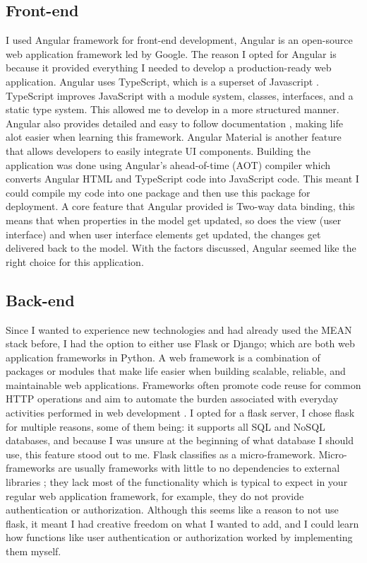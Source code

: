 \subsection{Front-end}
I used Angular framework for front-end development, Angular is an open-source web application framework led by Google. The reason I opted for Angular is because it provided everything I needed to develop a production-ready web application. Angular uses TypeScript, which is a superset of Javascript \cite{bierman2014understanding}. TypeScript improves JavaScript with a module system, classes, interfaces, and a static type system. This allowed me to develop in a more structured manner. Angular also provides detailed and easy to follow documentation \cite{docsangular}, making life alot easier when learning this framework.
Angular Material is another feature that allows developers to easily integrate UI components. Building the application was done using Angular's ahead-of-time (AOT) compiler \cite{aotc} which converts Angular HTML and TypeScript code into JavaScript code. This meant I could compile my code into one package and then use this package for deployment. A core feature that Angular provided is Two-way data binding, this means that when properties in the model get updated, so does the view (user interface) and when user interface elements get updated, the changes get delivered back to the model.
With the factors discussed, Angular seemed like the right choice for this application.
\subsection{Back-end}
Since I wanted to experience new technologies and had already used the MEAN stack before, I had the option to either use Flask or Django; which are both web application frameworks in Python. A web framework is a combination of packages or modules that make life easier when building scalable, reliable, and maintainable web applications. Frameworks often promote code reuse for common HTTP operations and aim to automate the burden associated with everyday activities performed in web development \cite{rengglib2004seaside}. \hfill \break
I opted for a flask server, I chose flask for multiple reasons, some of them being: it supports all SQL and NoSQL databases, and because I was unsure at the beginning of what database I should use, this feature stood out to me.
Flask classifies as a micro-framework. Micro-frameworks are usually frameworks with little to no dependencies to external libraries \cite{aboutflask}; they lack most of the functionality which is typical to expect in your regular web application framework, for example, they do not provide authentication or authorization. Although this seems like a reason to not use flask, it meant I had creative freedom on what I wanted to add, and I could learn how functions like user authentication or authorization worked by implementing them myself. \hfill \break
